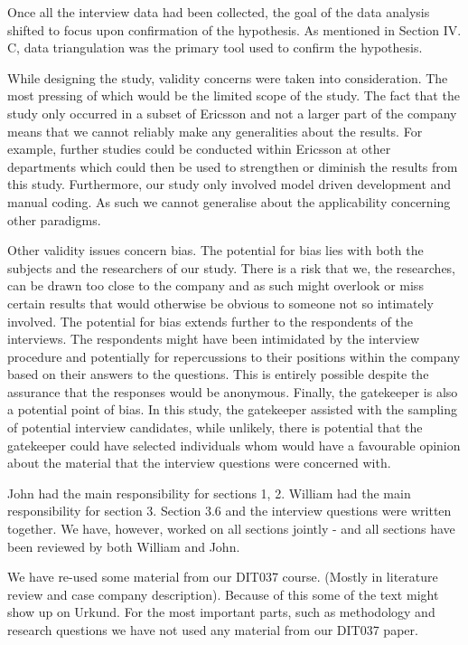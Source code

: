 \documentclass[10pt,twocolumn]{article}
\begin{document}
Once all the interview data had been collected, the goal of the data analysis shifted to focus upon confirmation of the hypothesis. As mentioned in Section IV. C, data triangulation was the primary tool used to confirm the hypothesis. 

While designing the study, validity concerns were taken into consideration. The most pressing of which would be the limited scope of the study. The fact that the study only occurred in a subset of Ericsson and not a larger part of the company means that we cannot reliably make any generalities about the results. For example, further studies could be conducted within Ericsson at other departments which could then be used to strengthen or diminish the results from this study. Furthermore, our study only involved model driven development and manual coding. As such we cannot generalise about the applicability concerning other paradigms.

Other validity issues concern bias. The potential for bias lies with both the subjects and the researchers of our study. There is a risk that we, the researches, can be drawn too close to the company and as such might overlook or miss certain results that would otherwise be obvious to someone not so intimately involved. The potential for bias extends further to the respondents of the interviews. The respondents might have been intimidated by the interview procedure and potentially for repercussions to their positions within the company based on their answers to the questions. This is entirely possible despite the assurance that the responses would be anonymous. Finally, the gatekeeper is also a potential point of bias. In this study, the gatekeeper assisted with the sampling of potential interview candidates, while unlikely, there is potential that the gatekeeper could have selected individuals whom would have a favourable opinion about the material that the interview questions were concerned with.






John had the main responsibility for sections 1, 2. William had the main responsibility for section 3. Section 3.6 and the interview questions were written together. We have, however, worked on all sections jointly - and all sections have been reviewed by both William and John. 

We have re-used some material from our DIT037 course. (Mostly in literature review and case company description). Because of this some of the text might show up on Urkund. For the most important parts, such as methodology and research questions we have not used any material from our DIT037 paper. 
\end{document}
